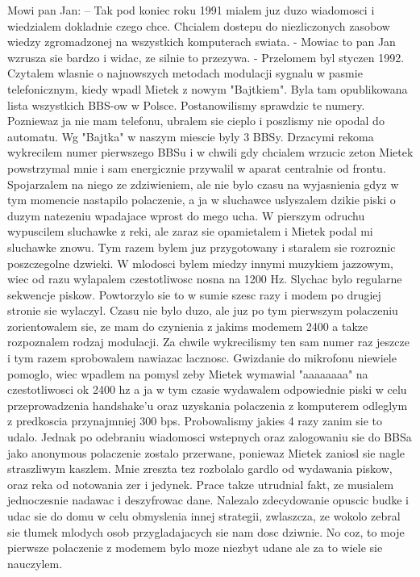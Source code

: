 \documentclass[a4paper,polish,titlepage,12pt]{article}
\begin{document}
Mowi pan Jan:
-- Tak pod koniec roku 1991 mialem juz duzo wiadomosci i wiedzialem dokladnie czego chce. Chcialem dostepu do niezliczonych zasobow wiedzy zgromadzonej na wszystkich komputerach swiata. - Mowiac to pan Jan wzrusza sie bardzo i widac, ze silnie to przezywa.
- Przelomem byl styczen 1992. Czytalem wlasnie o najnowszych metodach modulacji sygnalu w pasmie telefonicznym, kiedy wpadl Mietek z nowym "Bajtkiem". Byla tam opublikowana lista wszystkich BBS-ow w Polsce. Postanowilismy sprawdzic te numery. Pozniewaz ja nie mam telefonu, ubralem sie cieplo i poszlismy nie opodal do automatu. Wg "Bajtka" w naszym miescie byly 3 BBSy. Drzacymi rekoma wykrecilem numer pierwszego BBSu i w chwili gdy chcialem wrzucic zeton Mietek powstrzymal mnie i sam energicznie przywalil w aparat centralnie od frontu. Spojarzalem na niego ze zdziwieniem, ale nie bylo czasu na wyjasnienia gdyz w tym momencie nastapilo polaczenie, a ja w sluchawce uslyszalem dzikie piski o duzym natezeniu wpadajace wprost do mego ucha. W pierszym odruchu wypuscilem sluchawke z reki, ale zaraz sie opamietalem i Mietek podal mi sluchawke znowu. Tym razem bylem juz przygotowany i staralem sie rozroznic poszczegolne dzwieki. W mlodosci bylem miedzy innymi muzykiem jazzowym, wiec od razu wylapalem czestotliwosc nosna na 1200 Hz. Slychac bylo regularne sekwencje piskow. Powtorzylo sie to w sumie szesc razy i modem po drugiej stronie sie wylaczyl. Czasu nie bylo duzo, ale juz po tym pierwszym polaczeniu zorientowalem sie, ze mam do czynienia z jakims modemem 2400 a takze rozpoznalem rodzaj modulacji. Za chwile wykrecilismy ten sam numer raz jeszcze i tym razem sprobowalem nawiazac lacznosc. Gwizdanie do mikrofonu niewiele pomoglo, wiec wpadlem na pomysl zeby Mietek wymawial "aaaaaaaa" na czestotliwosci ok 2400 hz a ja w tym czasie wydawalem odpowiednie piski w celu przeprowadzenia handshake'u oraz uzyskania polaczenia z komputerem odleglym z predkoscia przynajmniej 300 bps. Probowalismy jakies 4 razy zanim sie to udalo. Jednak po odebraniu wiadomosci wstepnych oraz zalogowaniu sie do BBSa jako anonymous polaczenie zostalo przerwane, poniewaz Mietek zaniosl sie nagle straszliwym kaszlem. Mnie zreszta tez rozbolalo gardlo od wydawania piskow, oraz reka od notowania zer i jedynek. Prace takze utrudnial fakt, ze musialem jednoczesnie nadawac i deszyfrowac dane. Nalezalo zdecydowanie opuscic budke i udac sie do domu w celu obmyslenia innej strategii, zwlaszcza, ze wokolo zebral sie tlumek mlodych osob przygladajacych sie nam dosc dziwnie. No coz, to moje pierwsze polaczenie z modemem bylo moze niezbyt udane ale za to wiele sie nauczylem.
\end{document}
